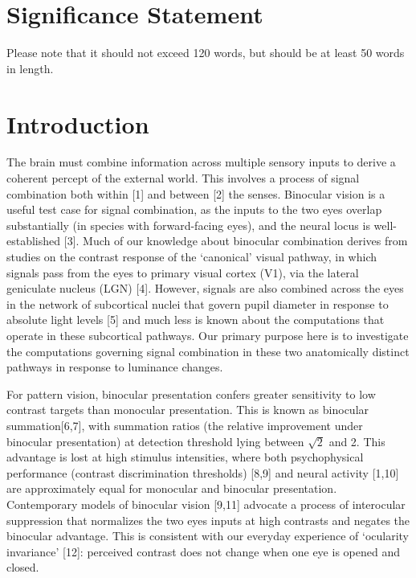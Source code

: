 \documentclass[
]{article}
\begin{document}
\hypertarget{significance-statement}{%
\section{Significance Statement}\label{significance-statement}}

Please note that it should not exceed 120 words, but should be at least 50 words in length.

\hypertarget{introduction}{%
\section{Introduction}\label{introduction}}

The brain must combine information across multiple sensory inputs to derive a coherent percept of the external world. This involves a process of signal combination both within {[}1{]} and between {[}2{]} the senses. Binocular vision is a useful test case for signal combination, as the inputs to the two eyes overlap substantially (in species with forward-facing eyes), and the neural locus is well-established {[}3{]}. Much of our knowledge about binocular combination derives from studies on the contrast response of the `canonical' visual pathway, in which signals pass from the eyes to primary visual cortex (V1), via the lateral geniculate nucleus (LGN) {[}4{]}. However, signals are also combined across the eyes in the network of subcortical nuclei that govern pupil diameter in response to absolute light levels {[}5{]} and much less is known about the computations that operate in these subcortical pathways. Our primary purpose here is to investigate the computations governing signal combination in these two anatomically distinct pathways in response to luminance changes.

For pattern vision, binocular presentation confers greater sensitivity to low contrast targets than monocular presentation. This is known as binocular summation{[}6,7{]}, with summation ratios (the relative improvement under binocular presentation) at detection threshold lying between \(\sqrt{2}\) and 2. This advantage is lost at high stimulus intensities, where both psychophysical performance (contrast discrimination thresholds) {[}8,9{]} and neural activity {[}1,10{]} are approximately equal for monocular and binocular presentation. Contemporary models of binocular vision {[}9,11{]} advocate a process of interocular suppression that normalizes the two eyes inputs at high contrasts and negates the binocular advantage. This is consistent with our everyday experience of `ocularity invariance' {[}12{]}: perceived contrast does not change when one eye is opened and closed.
\end{document}
